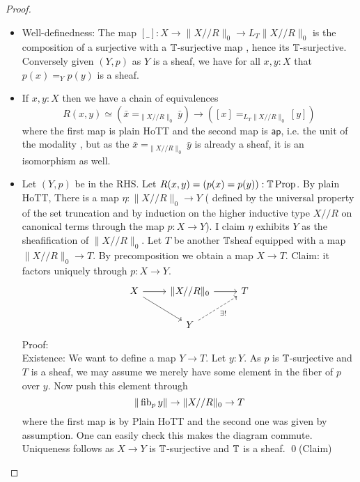 \documentclass{article}
\begin{document}
\begin{proof}
\begin{itemize}
    \item Well-definedness: The map $[\_] : X \to \|X // R\|_0 \to L_T \|X // R\|_0$ is the composition of a surjective with a $\mathbb{T}$-surjective map \todocite, hence its $\mathbb{T}$-surjective. \\
    Conversely given $(Y,p)$ as $Y$ is a sheaf, we have for all $x,y : X$ that $p(x) =_Y p(y)$ is a sheaf.
    \item If $x,y : X$ then we have a chain of equivalences 
    \[
    R(x,y) \simeq (\bar x =_{\|X//R\|_0} \bar y) \to ([x] =_{L_T\|X//R\|_0} [y])
    \]
    where the first map is plain HoTT and the second map is $\mathsf{ap}$, i.e. the unit of the modality \todocite, but as the $\bar x =_{\|X//R\|_0} \bar y$ is already a sheaf, it is an isomorphism as well. \\
    \item Let $(Y,p)$ be in the RHS. Let $R(x,y) = (p(x)=p(y)) : \mathbb{T} \operatorname{Prop}$. By plain HoTT, There is a map $\eta : \| X // R \|_0 \to Y$ ( defined by the universal property of the set truncation and by induction on the higher inductive type $ X // R$ on canonical terms through the map $p : X \to Y$). I claim $\eta$ exhibits $Y$ as the sheafification of $\|X // R\|_0$. Let $T$ be another $\mathbb{T}$sheaf equipped with a map $\|X // R \|_0 \to T$. By precomposition we obtain a map $X \to T$. 
    Claim: it factors uniquely through $p : X \to Y$. 
\[\begin{tikzcd}
	X & {\|X // R\|_0} & T \\
	& Y
	\arrow[from=1-1, to=1-2]
	\arrow[from=1-1, to=2-2]
	\arrow[from=1-2, to=1-3]
	\arrow["{\exists!}"', dashed, from=2-2, to=1-3]
\end{tikzcd}\]
Proof: \\
    Existence: We want to define a map $Y \to T$. Let $y : Y$. As $p$ is $\mathbb{T}$-surjective and $T$ is a sheaf, we may assume we merely have some element in the fiber of $p$ over $y$. Now push this element through     
    \[\|\operatorname{fib}_p y\| \to \|X // R\|_0 \to T\]
    where the first map is by Plain HoTT and the second one was given by assumption. One can easily check this makes the diagram commute.
    Uniqueness follows as $X \to Y$ is $\mathbb{T}$-surjective and $\mathbb{T}$ is a sheaf. \qed(Claim) \\

\end{itemize}
\end{proof}
\end{document}
